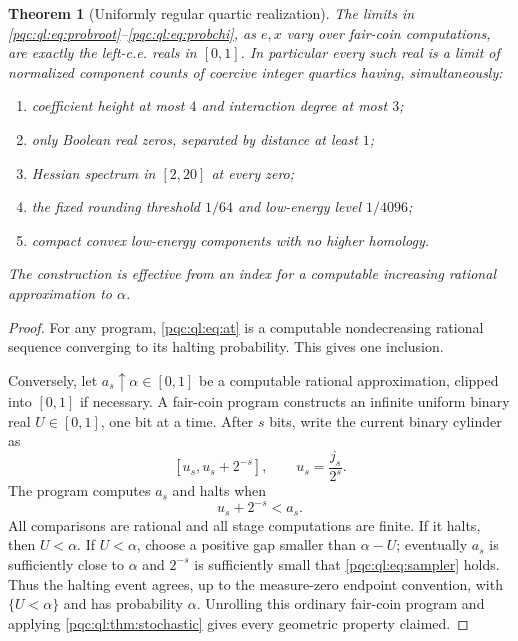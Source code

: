 \documentclass[11pt,letterpaper]{article}
\numberwithin{equation}{section}
\newtheorem{theorem}{Theorem}[section]
\theoremstyle{definition}
\theoremstyle{remark}
\begin{document}
\begin{theorem}[Uniformly regular quartic realization]\label{pqc:ql:thm:realization}
The limits in \eqref{pqc:ql:eq:probroot}--\eqref{pqc:ql:eq:probchi}, as $e,x$ vary over
fair-coin computations, are exactly the left-c.e. reals in $[0,1]$. In
particular every such real is a limit of normalized component counts of
coercive integer quartics having, simultaneously:
\begin{enumerate}[label=(\roman*)]
\item coefficient height at most $4$ and interaction degree at most $3$;
\item only Boolean real zeros, separated by distance at least $1$;
\item Hessian spectrum in $[2,20]$ at every zero;
\item the fixed rounding threshold $1/64$ and low-energy level $1/4096$;
\item compact convex low-energy components with no higher homology.
\end{enumerate}
The construction is effective from an index for a computable increasing
rational approximation to $\alpha$.
\end{theorem}
\begin{proof}
For any program, \eqref{pqc:ql:eq:at} is a computable nondecreasing rational
sequence converging to its halting probability. This gives one inclusion.

Conversely, let $a_s\uparrow\alpha\in[0,1]$ be a computable rational
approximation, clipped into $[0,1]$ if necessary. A fair-coin program
constructs an infinite uniform binary real $U\in[0,1]$, one bit at a time.
After $s$ bits, write the current binary cylinder as
\[
 [u_s,u_s+2^{-s}],\qquad u_s=\frac{j_s}{2^s}.
\]
The program computes $a_s$ and halts when
\begin{equation}\label{pqc:ql:eq:sampler}
 u_s+2^{-s}<a_s.
\end{equation}
All comparisons are rational and all stage computations are finite. If
it halts, then $U<\alpha$. If $U<\alpha$, choose a positive gap smaller
than $\alpha-U$; eventually $a_s$ is sufficiently close to $\alpha$ and
$2^{-s}$ is sufficiently small that \eqref{pqc:ql:eq:sampler} holds. Thus the
halting event agrees, up to the measure-zero endpoint convention, with
$\{U<\alpha\}$ and has probability $\alpha$. Unrolling this ordinary
fair-coin program and applying \cref{pqc:ql:thm:stochastic} gives every geometric
property claimed.
\end{proof}
\end{document}
